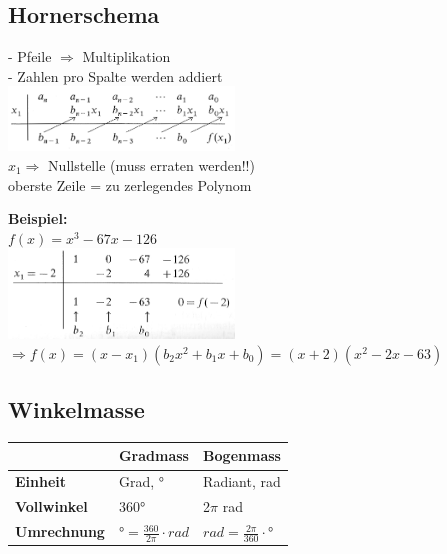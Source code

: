 \subsection{Hornerschema}
\begin{minipage}[t]{9cm}
	- Pfeile $\Rightarrow$ Multiplikation\\
	- Zahlen pro Spalte werden addiert\\
	\includegraphics[width=6cm]{images/hornerschema_1.png}\\
	$x_1 \Rightarrow$ Nullstelle (muss erraten werden!!)\\
	oberste Zeile = zu zerlegendes Polynom			
\end{minipage}
\begin{minipage}[t]{9cm}
	\textbf{Beispiel:}\\
	$f(x) = x^3-67x-126$\\
	\includegraphics[width=6cm]{images/hornerschema_2.png}\\
	$\Rightarrow f(x) = (x-x_1)(b_2x^2 + b_1x + b_0) = (x+2)(x^2-2x-63)$	
\end{minipage}
\subsection{Winkelmasse}
\begin{tabular}{|l|l|l|}
	\hline & \textbf{Gradmass} & \textbf{Bogenmass}\\
	\hline \textbf{Einheit}& Grad, ° & Radiant, rad\\
	\hline \textbf{Vollwinkel}&  360° & 2$\pi$ rad\\
	\hline \textbf{Umrechnung} & $°= \frac{360}{2\pi} \cdot rad$ & $rad= \frac{2\pi}{360} \cdot °$\\
	\hline
\end{tabular}
\clearpage
\pagebreak